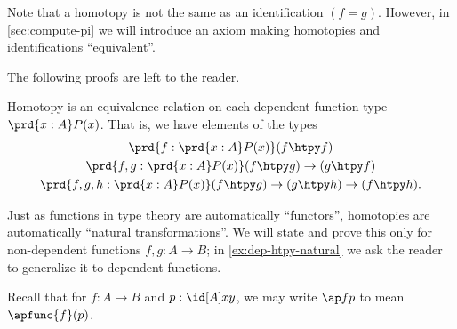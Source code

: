 Note that a homotopy is not the same as an identification $(f=g)$.
However, in \cref{sec:compute-pi} we will introduce an axiom making homotopies and identifications ``equivalent''.

The following proofs are left to the reader.

\begin{lem}\label{lem:homotopy-props}
  Homotopy is an equivalence relation on each dependent function type $\prd{x:A} P(x)$.
  That is, we have elements of the types
  \begin{gather*}
    \prd{f:\prd{x:A} P(x)} (f\htpy f)\\
    \prd{f,g:\prd{x:A} P(x)} (f\htpy g) \to (g\htpy f)\\
    \prd{f,g,h:\prd{x:A} P(x)} (f\htpy g) \to (g\htpy h) \to (f\htpy h).
  \end{gather*}
\end{lem}


%
%
Just as functions in type theory are automatically ``functors'', homotopies are automatically
%
``natural transformations''.
We will state and prove this only for non-dependent functions $f,g:A\to B$; in \cref{ex:dep-htpy-natural} we ask the reader to generalize it to dependent functions.

Recall that for $f:A\to B$ and $p:\id[A]xy$, we may write $\ap f p$ to mean $\apfunc{f} (p)$.

